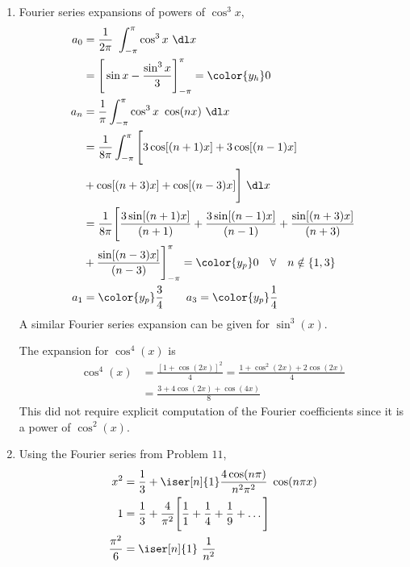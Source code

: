 \begin{enumerate}
    \item Fourier series expansions of powers of $ \cos^3 x$,
          \begin{align}
              a_0 & = \frac{1}{2\pi}\ \int_{-\pi}^{\pi} \cos^3 x\ \dl x         \\
                  & = \Bigg[ \sin x - \frac{\sin^3 x}{3}\Bigg]_{-\pi}^{\pi}
              = \color{y_h} 0                                                   \\
              a_n & = \frac{1}{\pi} \int_{-\pi}^{\pi} \cos^3 x\ \cos(nx)\ \dl x \\
                  & = \frac{1}{8\pi} \int_{-\pi}^{\pi}
              \Bigg[3\cos[(n+1)x] + 3\cos[(n-1)x]                               \\
                  & + \cos[(n+3)x] + \cos[(n-3)x]\Bigg]\ \dl x                  \\
                  & = \frac{1}{8\pi} \Bigg[ \frac{3\sin[(n+1)x]}{(n+1)}
              + \frac{3\sin[(n-1)x]}{(n-1)} + \frac{\sin[(n+3)x]}{(n+3)}        \\
                  & + \frac{\sin[(n-3)x]}{(n-3)} \Bigg]_{-\pi}^{\pi}
              = \color{y_p} 0 \quad \forall \quad n \notin \{1, 3\}             \\
              a_1 & = {\color{y_p} \frac{3}{4}} \qquad
              a_3 = {\color{y_p} \frac{1}{4}}
          \end{align}
          A similar Fourier series expansion can be given for $ \sin^3(x) $. \par
          The expansion for $ \cos^4(x) $ is
          \begin{align}
              \cos^4(x) & = \frac{[1 + \cos(2x)]^2}{4}
              = \frac{1 + \cos^2(2x) + 2\cos(2x)}{4}           \\
                        & = \frac{3 + 4\cos(2x) + \cos(4x)}{8}
          \end{align}
          This did not require explicit computation of the Fourier coefficients since
          it is a power of $ \cos^2(x) $.

    \item Using the Fourier series from Problem $ 11 $,
          \begin{align}
              x^2             & = \frac{1}{3} + \iser[n]{1}
              \frac{4\cos(n\pi)}{n^2 \pi^2} \ \cos(n\pi x)             \\
              1               & = \frac{1}{3} + \frac{4}{\pi^2} \Bigg[
              \frac{1}{1} + \frac{1}{4} + \frac{1}{9} + \dots \Bigg]   \\
              \frac{\pi^2}{6} & = \iser[n]{1}\ \frac{1}{n^2}
          \end{align}


\end{enumerate}
